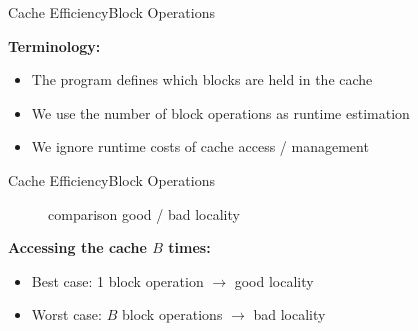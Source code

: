 
\begin{frame}{Cache Efficiency}{Block Operations}
  \vspace{-2.0em}
  \begin{figure}%
    \begin{adjustbox}{width=\linewidth}%
    \end{adjustbox}%
    \label{fig:caching:cache_quanting2}
  \end{figure}%
  \textbf{Terminology:}
  \begin{itemize}
    \item<2->
      The program defines which blocks are held in the
      {\color{MainA}cache}
    \item<3->
      We use the number of {\color{MainA}block operations} as runtime
      estimation
    \item<4->
      We ignore runtime costs of cache access / management
  \end{itemize}
\end{frame}


\begin{frame}{Cache Efficiency}{Block Operations}
  \vspace{-2.0em}
  \begin{figure}%
    \begin{adjustbox}{width=\linewidth}%
    \end{adjustbox}%
    \caption{comparison good / bad locality}
    \label{fig:caching:memory_locality}
  \end{figure}%
  \textbf{Accessing the cache {\color{MainA}$B$} times:}
  \begin{itemize}
    \item
      {\color{MainA}Best case}:
      1 block operation $\rightarrow$ good locality
    \item
      {\color{MainA}Worst case}:
      {\color{MainA}$B$} block operations $\rightarrow$ bad locality
  \end{itemize}
\end{frame}


